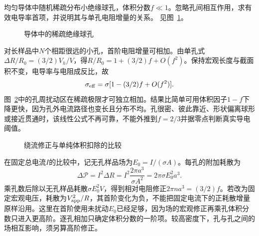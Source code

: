 \begin{exercise}[稀疏球孔的有效电导率]\label{ex:es3-h13}
均匀导体中随机稀疏分布小绝缘球孔，体积分数$f\ll1$。忽略孔间相互作用，求有效电导率首项，并说明其与单孔电阻增量的关系。 见图~\ref{fig:es3-h13-q}。
\end{exercise}

\begin{figure}[H]\centering
{}
\caption{导体中的稀疏绝缘球孔}\label{fig:es3-h13-q}
\end{figure}
\begin{solution}
对长样品中$N$个相距很远的小孔，首阶电阻增量可相加。由单孔式$\Delta R/R_0=(3/2)V_h/V$，得$R/R_0=1+(3/2)f+O(f^2)$。保持宏观长度与截面积不变，电导率与电阻成反比，故
\[\sigma_{\rm eff}=\sigma[1-(3/2)f+O(f^2)].\]
图~\ref{fig:es3-h13-s}中的孔周扰动区在稀疏极限才可独立相加。结果比简单可用体积因子$1-f$下降更快，因为孔外电流路径也变长且分布不均。孔很密、彼此靠近、形状偏离球形或接近贯通时，该线性公式不再可靠，不能外推到$f=2/3$并据零点判断真实导电阈值。
\begin{figure}[H]\centering
{}
\caption{绕流修正与单纯体积扣除的比较}\label{fig:es3-h13-s}
\end{figure}


在固定总电流$I$的比较中，记无孔样品场为$E_0=I/(\sigma A)$。每孔的附加耗散为
\[\Delta\mathcal P=I^2\Delta R
=I^2\frac{2\pi a^3}{\sigma A^2}=2\pi\sigma E_0^2a^3.
\]
乘孔数后除以无孔样品耗散$\sigma E_0^2V$，得到相对电阻修正$2\pi na^3=(3/2)f$。若改为固定宏观电压，耗散为$V_{\rm app}^2/R$，其首阶变化为负，不能把固定电流下的正耗散增量原样沿用。这里在首阶使用未扰动$E_0$已经足够，因为场的宏观修正再乘孔体积分数只进入更高阶。逐孔相加只确定体积分数的一阶项。较高密度下，孔与孔之间的场相互影响，须另算高阶修正。
\end{solution}

